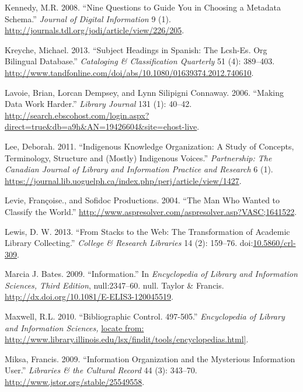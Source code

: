 \documentclass[]{article}
\begin{document}
\hypertarget{ref-kennedyux5fnineux5f2008}{}
Kennedy, M.R. 2008. ``Nine Questions to Guide You in Choosing a Metadata
Schema.'' \emph{Journal of Digital Information} 9 (1).
\url{http://journals.tdl.org/jodi/article/view/226/205}.

\hypertarget{ref-kreycheux5fsubjectux5f2013}{}
Kreyche, Michael. 2013. ``Subject Headings in Spanish: The Lcsh-Es. Org
Bilingual Database.'' \emph{Cataloging \& Classification Quarterly} 51
(4): 389--403.
\url{http://www.tandfonline.com/doi/abs/10.1080/01639374.2012.740610}.

\hypertarget{ref-lavoieux5fmakingux5f2006}{}
Lavoie, Brian, Lorcan Dempsey, and Lynn Silipigni Connaway. 2006.
``Making Data Work Harder.'' \emph{Library Journal} 131 (1): 40--42.
\url{http://search.ebscohost.com/login.aspx?direct=true\&db=a9h\&AN=19426604\&site=ehost-live}.

\hypertarget{ref-leeux5findigenousux5f2011}{}
Lee, Deborah. 2011. ``Indigenous Knowledge Organization: A Study of
Concepts, Terminology, Structure and (Mostly) Indigenous Voices.''
\emph{Partnership: The Canadian Journal of Library and Information
Practice and Research} 6 (1).
\url{https://journal.lib.uoguelph.ca/index.php/perj/article/view/1427}.

\hypertarget{ref-levieux5fmanux5f2004}{}
Levie, Françoise., and Sofidoc Productions. 2004. ``The Man Who Wanted
to Classify the World.''
\url{http://www.aspresolver.com/aspresolver.asp?VASC;1641522}.

\hypertarget{ref-lewisux5fstacksux5f2013}{}
Lewis, D. W. 2013. ``From Stacks to the Web: The Transformation of
Academic Library Collecting.'' \emph{College \& Research Libraries} 14
(2): 159--76.
doi:\href{https://doi.org/10.5860/crl-309}{10.5860/crl-309}.

\hypertarget{ref-marciaux5fj.ux5fbatesux5finformationux5f2009}{}
Marcia J. Bates. 2009. ``Information.'' In \emph{Encyclopedia of Library
and Information Sciences, Third Edition}, null:2347--60. null. Taylor \&
Francis. \url{http://dx.doi.org/10.1081/E-ELIS3-120045519}.

\hypertarget{ref-maxwellux5fbibliographicux5f2010}{}
Maxwell, R.L. 2010. ``Bibliographic Control. 497-505.''
\emph{Encyclopedia of Library and Information Sciences,}
\href{locate\%20from:\%20http://www.library.illinois.edu/lsx/findit/tools/encyclopedias.html\%5D}{locate from: http://www.library.illinois.edu/lsx/findit/tools/encyclopedias.html{]}}.

\hypertarget{ref-miksaux5finformationux5f2009}{}
Miksa, Francis. 2009. ``Information Organization and the Mysterious
Information User.'' \emph{Libraries \& the Cultural Record} 44 (3):
343--70. \url{http://www.jstor.org/stable/25549558}.
\end{document}
